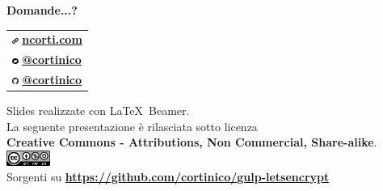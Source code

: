 \documentclass[xcolor=svgnames,11pt]{beamer}
\begin{document}
\begin{frame}{}
\begin{center}
\begin{Huge}
{\color{leorange} \textbf{Domande...?}}
\end{Huge}

\vspace{1.5cm}

\begin{center}
\begin{tabular}{>{\centering\arraybackslash}p{4cm}}
\includegraphics[height=0.2cm]{img/logo_web.pdf} \textbf{\href{https://ncorti.com}{ ncorti.com}} \\
\includegraphics[height=0.2cm]{img/logo_twitter.pdf} \textbf{\href{https://twitter.com/cortinico}{ @cortinico}} \\
\includegraphics[height=0.2cm]{img/logo_gh.pdf} \textbf{\href{https://github.com/cortinico}{ @cortinico}} \\
\end{tabular}
\end{center}

\bigskip

\begin{footnotesize}
Slides realizzate con \LaTeX\ Beamer.\\
La seguente presentazione \`e rilasciata sotto licenza\\
\textbf{Creative Commons - Attributions, Non Commercial, Share-alike}.
\\
\medskip
\includegraphics[height=0.5cm]{img/cc.png}
\\
\medskip
Sorgenti su \textbf{\url{https://github.com/cortinico/gulp-letsencrypt}}
\end{footnotesize}

\end{center}
\end{frame}
\end{document}
